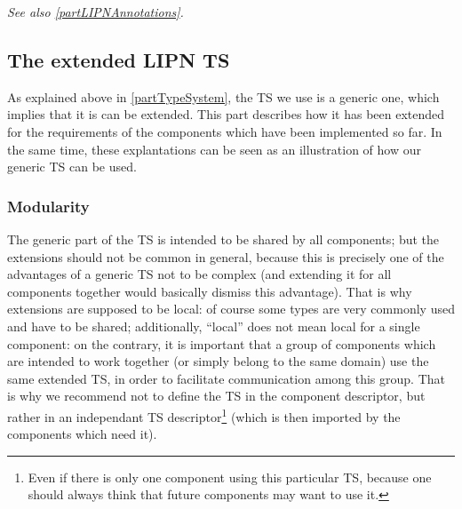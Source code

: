\documentclass{article}
\begin{document}
{\em See also \ref{partLIPNAnnotations}.}


\subsection{The extended LIPN TS}
\label{partExtendedTS}
As explained above in \ref{partTypeSystem}, the TS we use is a generic one, which implies that it is can  be extended. This part describes how it has been extended for the requirements of the components which have been implemented so far. In the same time, these explantations can be seen as an illustration of how our generic TS can be used.

\subsubsection{Modularity}

The generic part of the TS is intended to be shared by all components; but the extensions should not be common in general, because this is precisely one of the advantages of a generic TS not to be complex (and extending it for all components together would basically dismiss this advantage). That is why extensions are supposed to be local: of course some types are very commonly used and have to be shared; additionally, ``local'' does not mean local for a single component: on the contrary, it is important that a group of components which are intended to work together (or simply belong to the same domain) use the same extended TS, in order to facilitate communication among this group. That is why we recommend not to define the TS in the component descriptor, but rather in an independant TS descriptor\footnote{Even if there is only one component using this particular TS, because one should always think that future components may want to use it.} (which is then imported by the components which need it).
\end{document}
